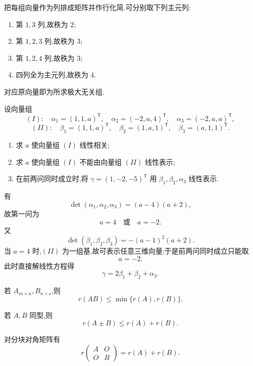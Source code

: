 \begin{solution}
把每组向量作为列排成矩阵并作行化简.可分别取下列主元列:
\begin{enumerate}
  \item 第 $1,3$ 列,故秩为 $2$;
  \item 第 $1,2,3$ 列,故秩为 $3$;
  \item 第 $1,2,4$ 列,故秩为 $3$;
  \item 四列全为主元列,故秩为 $4$.
\end{enumerate}
对应原向量即为所求极大无关组.
\end{solution}

\begin{example}
设向量组
\[
(I):\quad
\alpha_1=(1,1,a)^{\mathsf T},\quad
\alpha_2=(-2,a,4)^{\mathsf T},\quad
\alpha_3=(-2,a,a)^{\mathsf T},
\]
\[
(II):\quad
\beta_1=(1,1,a)^{\mathsf T},\quad
\beta_2=(1,a,1)^{\mathsf T},\quad
\beta_3=(a,1,1)^{\mathsf T}.
\]
\begin{enumerate}
  \item 求 $a$ 使向量组 $(I)$ 线性相关;
  \item 求 $a$ 使向量组 $(I)$ 不能由向量组 $(II)$ 线性表示;
  \item 在前两问同时成立时,将 $\gamma=(1,-2,-5)^{\mathsf T}$ 用 $\beta_1,\beta_2,\alpha_3$ 线性表示.
\end{enumerate}
\end{example}
\exampleblank

\begin{solution}
有
\[
 \det(\alpha_1,\alpha_2,\alpha_3)=(a-4)(a+2),
\]
故第一问为
\[
 a=4\quad\text{或}\quad a=-2.
\]
又
\[
 \det(\beta_1,\beta_2,\beta_3)=-(a-1)^2(a+2).
\]
当 $a=4$ 时,$(II)$ 为一组基,故可表示任意三维向量;于是前两问同时成立只能取
\[
 \boxed{a=-2}.
\]
此时直接解线性方程得
\[
 \boxed{\gamma=2\beta_1+\beta_2+\alpha_3}.
\]
\end{solution}

\begin{proposition}[\marktwostar]
若 $A_{m\times n},B_{n\times s}$,则
\[
 r(AB)\leq\min\{r(A),r(B)\}.
\]
\end{proposition}

\begin{proposition}[\marktwostar]
若 $A,B$ 同型,则
\[
 r(A\pm B)\leq r(A)+r(B).
\]
\end{proposition}

\begin{proposition}[\marktwostar]
对分块对角矩阵有
\[
 r\begin{pmatrix}A&O\\O&B\end{pmatrix}=r(A)+r(B).
\]
\end{proposition}

